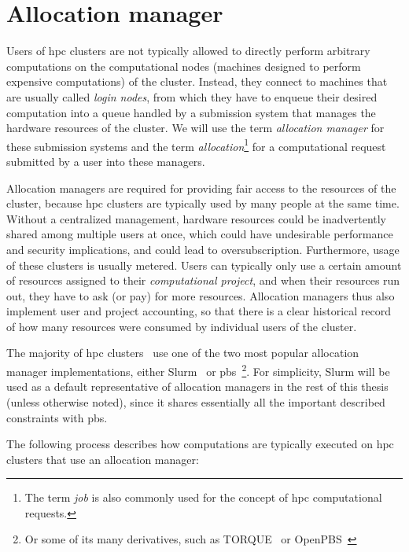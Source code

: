 \section{Allocation manager}
\label{challenge:allocation-manager}
Users of \gls{hpc} clusters are not typically allowed to directly perform arbitrary
computations on the computational nodes (machines designed to perform expensive computations) of
the cluster. Instead, they connect to machines that are usually called \emph{login nodes}, from
which they have to enqueue their desired computation into a queue handled by a submission system
that manages the hardware resources of the cluster. We will use the term \emph{allocation manager} for
these submission systems and the term \emph{allocation}\footnote{The term \emph{job} is also commonly used for the concept of \gls{hpc}
computational requests.} for a
computational request submitted by a user into these managers.

Allocation managers are required for providing fair access to the resources of the cluster, because
\gls{hpc} clusters are typically used by many people at the same time. Without a
centralized management, hardware resources could be inadvertently shared among multiple users at
once, which could have undesirable performance and security implications, and could lead to
oversubscription. Furthermore, usage of these clusters is usually metered. Users can typically only
use a certain amount of resources assigned to their \emph{computational project}, and when their
resources run out, they have to ask (or pay) for more resources. Allocation managers thus also
implement user and project accounting, so that there is a clear historical record of how many
resources were consumed by individual users of the cluster.

The majority of \gls{hpc} clusters~\cite{slurm-schedmd} use one of the two most
popular allocation manager implementations, either Slurm~\cite{slurm} or
\gls{pbs}~\cite{pbs}\footnote{Or some of its many derivatives,
such as TORQUE~\cite{torque} or OpenPBS~\cite{openpbs}}. For simplicity, Slurm will be
used as a default representative of allocation managers in the rest of this thesis (unless
otherwise noted), since it shares essentially all the important described constraints with
\gls{pbs}.

The following process describes how computations are typically executed on \gls{hpc}
clusters that use an allocation manager:

